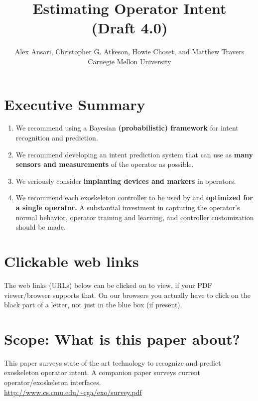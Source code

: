 \documentclass[letterpaper,12pt,fullpage]{article}
\begin{document}
\title{Estimating Operator Intent\\
(Draft 4.0)}

\author{Alex Ansari, Christopher G. Atkeson, Howie Choset, and Matthew Travers\\
Carnegie Mellon University}

\maketitle

\section{Executive Summary}

\begin{enumerate}
\item
We recommend using a Bayesian {\bf (probabilistic) framework}
for intent recognition and prediction.
\item
We recommend developing an intent prediction system that can use
as {\bf many sensors and measurements} of the operator as possible.
\item
We seriously consider {\bf implanting devices and markers} in operators.
\item
We recommend each exoskeleton controller
to be used by and {\bf optimized for a single operator.}
A substantial investment in capturing the operator's normal behavior,
operator training and learning, and controller customization should be made.
\end{enumerate}

\section{Clickable web links}

The web links (URLs) below can be clicked on to view, if your PDF viewer/browser supports that. On our browsers you actually have to click on the black
part of a letter, not just in the blue box (if present).

\section{Scope: What is this paper about?}

This paper surveys state of the art technology to recognize
and predict exoskeleton
operator intent.
A companion paper surveys current operator/exoskeleton interfaces.\\
\url{http://www.cs.cmu.edu/~cga/exo/survey.pdf}
\end{document}
